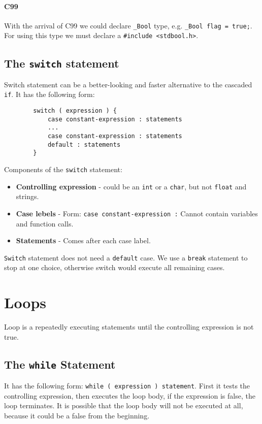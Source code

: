 \documentclass[openany]{book}
\begin{document}
    \subsubsection*{C99}
    With the arrival of C99 we could declare \texttt{\_Bool} type, e.g.
    \texttt{\_Bool flag = true;}. For using this type we must declare a
    \texttt{\#include <stdbool.h>}.
    
    \section{The \texttt{switch} statement}
    Switch statement can be a better-looking and faster alternative to the cascaded
    \texttt{if}. It has the following form:
    \begin{lstlisting}
        switch ( expression ) {
            case constant-expression : statements
            ...
            case constant-expression : statements
            default : statements
        }
    \end{lstlisting}
    
    Components of the \texttt{switch} statement:
    \begin{itemize}
        \item \textbf{Controlling expression} - could be an \texttt{int} or a
        \texttt{char}, but not \texttt{float} and strings.
        \item \textbf{Case lebels} - Form: \texttt{case constant-expression :}
        Cannot contain variables and function calls.
        \item \textbf{Statements} - Comes after each case label.
    \end{itemize}
    \texttt{Switch} statement does not need a \texttt{default} case. We use a
    \texttt{break} statement to stop at one choice, otherwise switch would execute
    all remaining cases.

    \chapter{Loops}
    Loop is a repeatedly executing statements until the controlling expression
    is not true.
    
    \section{The \texttt{while} Statement}
    It has the following form: \texttt{while ( expression ) statement}. First
    it tests the controlling expression, then executes the loop body, if the
    expression is false, the loop terminates. It is possible that the loop
    body will not be executed at all, because it could be a false from the
    beginning.
    
\end{document}
